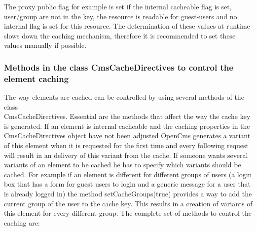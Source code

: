 \begin{itemize}
The proxy public flag for example is set if the internal cacheable flag is set, user/group
are not in the key, the resource is readable for guest-users and no internal flag is set for 
this resource.
The determination of these values at runtime slows down the caching mechanism, therefore it is
recommended to set these values manually if possible.

\end{itemize}
\subsubsection{Methods in the class CmsCacheDirectives to control the element caching} 
The way elements are cached can be controlled by using several methods of the 
class \\
{\class CmsCacheDirectives}. Essential are the methods that affect the way the cache 
key is generated. If an element is internal cacheable and the caching properties in the\\
{\class CmsCacheDirectives} object have not been adjusted OpenCms generates a variant of this 
element when it is requested for the first time and every following request will 
result in an delivery of this variant from the cache. If someone wants several
variants of an element to be cached he has to specify which variants should be cached. 
For example if an element is different for different groups of users (a login box that 
has a form for guest users to login and a generic message for a user that is already logged 
in) the method {\meth setCacheGroups(true)} provides a way to add the current group of the user to
the cache key. This results in a creation of variants of this element for every different 
group. The complete set of methods to control the caching are:

